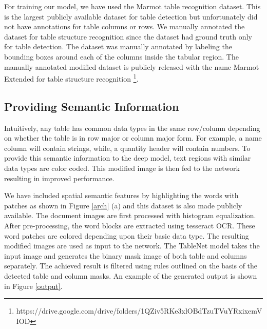 \documentclass[conference]{IEEEtran}
\begin{document}
For training our model, we have used the Marmot table recognition dataset. This is the largest publicly available dataset for table detection but unfortunately did not have annotations for table columns or rows. We manually annotated the dataset for table structure recognition since the dataset had ground truth only for table detection. The dataset was manually annotated by labeling the bounding boxes around each of the columns inside the tabular region. The manually annotated modified dataset is publicly released with the name Marmot Extended for table structure recognition \footnote{\label{datasetlink}https://drive.google.com/drive/folders/1QZiv5RKe3xlOBdTzuTVuYRxixemVIOD}.

\subsection{Providing Semantic Information}
 Intuitively, any table has common data types in the same row/column depending on whether the table is in row major or column major form. For example, a name column will contain strings, while, a quantity header will contain numbers. To provide this semantic information to the deep model, text regions with similar data types are color coded. This modified image is then fed to the network resulting in improved performance.


We have included spatial semantic features by highlighting the words with patches as shown in Figure \ref{arch} (a) and this dataset is also made publicly available. The document images are first processed with histogram equalization. After pre-processing, the word blocks are extracted using tesseract OCR. These word patches are colored depending upon their basic data type. The resulting modified images are used as input to the network. The TableNet model takes the input image and generates the binary mask image of both table and columns separately. The achieved result is filtered using rules outlined on the basis of the detected table and column masks. An example of the generated output is shown in Figure \ref{output}. 
\end{document}
